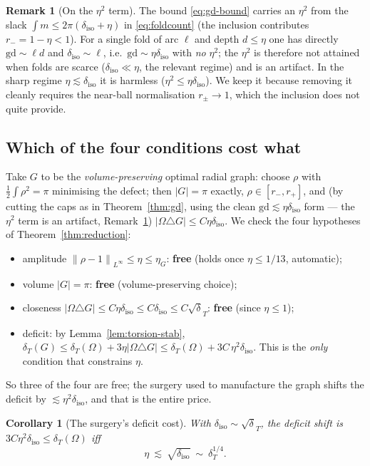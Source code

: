 \documentclass[11pt]{article}
\newtheorem{corollary}[theorem]{Corollary}
\theoremstyle{definition}
\newtheorem{remark}[theorem]{Remark}
\newcommand{\Om}{\Omega}
\newcommand{\dT}{\delta_T}
\newcommand{\diso}{\delta_{\mathrm{iso}}}
\newcommand{\gd}{\mathrm{gd}}
\newcommand{\norm}[1]{\left\|#1\right\|}
\newcommand{\abs}[1]{\left|#1\right|}
\begin{document}
\begin{remark}[On the $\eta^2$ term]\label{rem:eta2}
The bound \eqref{eq:gd-bound} carries an $\eta^2$ from the slack
$\int m\le 2\pi(\diso+\eta)$ in \eqref{eq:foldcount} (the inclusion
contributes $r_-=1-\eta<1$). For a single fold of arc $\ell$ and depth
$d\le\eta$ one has directly $\gd\sim\ell d$ and $\diso\sim\ell$, i.e.\
$\gd\sim\eta\diso$ with \emph{no} $\eta^2$; the $\eta^2$ is therefore not
attained when folds are scarce ($\diso\ll\eta$, the relevant regime) and is
an artifact. In the sharp regime $\eta\lesssim\diso$ it is harmless
($\eta^2\le\eta\diso$). We keep it because removing it cleanly requires the
near-ball normalisation $r_\pm\to1$, which the inclusion does not quite
provide.
\end{remark}

\subsection{Which of the four conditions cost what}
\label{ss:which-cost}

Take $G$ to be the \emph{volume-preserving} optimal radial graph: choose
$\rho$ with $\tfrac12\int\rho^2=\pi$ minimising the defect; then
$\abs G=\pi$ exactly, $\rho\in[r_-,r_+]$, and (by cutting the caps as in
Theorem~\ref{thm:gd}, using the clean $\gd\lesssim\eta\diso$ form ---
the $\eta^2$ term is an artifact, Remark~\ref{rem:eta2})
$\abs{\Om\triangle G}\le C\eta\diso$. We check the four hypotheses of
Theorem~\ref{thm:reduction}:
\begin{itemize}[leftmargin=2em]
\item[(i)] amplitude $\norm{\rho-1}_{L^\infty}\le\eta\le\eta_G$: \textbf{free}
(holds once $\eta\le1/13$, automatic);
\item[(ii)] volume $\abs G=\pi$: \textbf{free} (volume-preserving choice);
\item[(iv)] closeness $\abs{\Om\triangle G}\le C\eta\diso\le C\diso\le
C\sqrt\dT$: \textbf{free} (since $\eta\le1$);
\item[(iii)] deficit: by Lemma~\ref{lem:torsion-stab},
$\dT(G)\le\dT(\Om)+3\eta\abs{\Om\triangle G}\le\dT(\Om)+3C\,\eta^2\diso$.
This is the \emph{only} condition that constrains $\eta$.
\end{itemize}
So three of the four are free; the surgery used to manufacture the graph
shifts the deficit by $\lesssim\eta^2\diso$, and that is the entire price.

\begin{corollary}[The surgery's deficit cost]\label{cor:sharp-gd}
With $\diso\sim\sqrt\dT$, the deficit shift is
$3C\eta^2\diso\le\dT(\Om)$ \emph{iff}
\begin{equation}\label{eq:eta-cond}
   \eta\ \lesssim\ \sqrt{\diso}\ \sim\ \dT^{1/4}.
\end{equation}
\end{corollary}
\end{document}
